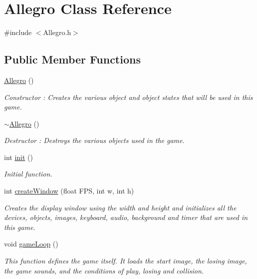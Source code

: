 \hypertarget{classAllegro}{
\section{Allegro Class Reference}
\label{classAllegro}
}


{\ttfamily \#include $<$Allegro.h$>$}\subsection*{Public Member Functions}
\begin{DoxyCompactItemize}
\item 
\hyperlink{classAllegro_a3f5c52ac57364f5587d88766ed75476e}{Allegro} ()
\begin{DoxyCompactList}\small\item\em Constructor : Creates the various object and object states that will be used in this game. \item\end{DoxyCompactList}\item 
\hyperlink{classAllegro_aaa80b9c26288f9d8d9888fc398d91b6c}{$\sim$Allegro} ()
\begin{DoxyCompactList}\small\item\em Destructor : Destroys the various objects used in the game. \item\end{DoxyCompactList}\item 
int \hyperlink{classAllegro_a5e00fb24164087bd89b0d6bfc6b319b7}{init} ()
\begin{DoxyCompactList}\small\item\em Initial function. \item\end{DoxyCompactList}\item 
int \hyperlink{classAllegro_a5669e6448fac3a62871a2fe5dcf00aeb}{createWindow} (float FPS, int w, int h)
\begin{DoxyCompactList}\small\item\em Creates the display window using the width and height and initializes all the devices, objects, images, keyboard, audio, background and timer that are used in this game. \item\end{DoxyCompactList}\item 
void \hyperlink{classAllegro_ae0fe43326c885fa115169c68d74e7ff5}{gameLoop} ()
\begin{DoxyCompactList}\small\item\em This function defines the game itself. It loads the start image, the losing image, the game sounds, and the conditions of play, losing and collision. \item\end{DoxyCompactList}\item 

\end{DoxyCompactItemize}
